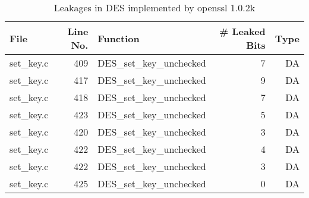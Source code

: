 \begin{table}[h!]
\centering\tiny\scriptsize
\renewcommand{\baselinestretch}{0.96}\selectfont
\caption{Leakages in DES implemented by openssl 1.0.2k}\label{tab:DESopenssl1.0.2k}
\begin{tabular}{lrlrr}
\hline
\textbf{File} & \textbf{Line No.} & \textbf{Function} & \textbf{\# Leaked Bits} & \textbf{Type} \\\hline
set\_key.c& 409&DES\_set\_key\_unchecked&7 &DA\\
set\_key.c& 417&DES\_set\_key\_unchecked&9 &DA\\
set\_key.c& 418&DES\_set\_key\_unchecked&7 &DA\\
set\_key.c& 423&DES\_set\_key\_unchecked&5 &DA\\
set\_key.c& 420&DES\_set\_key\_unchecked&3 &DA\\
set\_key.c& 422&DES\_set\_key\_unchecked&4 &DA\\
set\_key.c& 422&DES\_set\_key\_unchecked&3 &DA\\
set\_key.c& 425&DES\_set\_key\_unchecked&0 &DA\\
\hline
\end{tabular}
\renewcommand{\baselinestretch}{1.0}\selectfont
\end{table}
